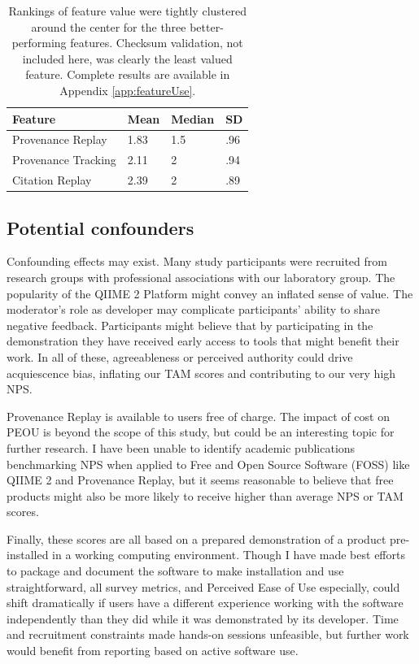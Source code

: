 \begin{table}[htp]
    \centering
    \begin{tabular}{|p{}|p{}|p{}|p{}|}
    \hline
    Feature             & Mean & Median & SD  \\ \hline
    Provenance Replay   & 1.83 & 1.5    & .96 \\
    Provenance Tracking & 2.11 & 2      & .94 \\
    Citation Replay     & 2.39 & 2      & .89 \\ \hline
    \end{tabular}
    \caption[Respondent rankings of feature value]%
    {Rankings of feature value were tightly clustered around the center for the
    three better-performing features. Checksum validation, not included here,
    was clearly the least valued feature. Complete results are available in
    Appendix \ref{app:featureUse}.}
    \label{tab:feature_rankings}
\end{table}

\subsection{Potential confounders}

Confounding effects may exist. Many study participants were recruited from
research groups with professional associations with our laboratory group. The
popularity of the QIIME 2 Platform might convey an inflated sense of value. The
moderator’s role as developer may complicate participants’ ability to share
negative feedback. Participants might believe that by participating in the
demonstration they have received early access to tools that might benefit their
work. In all of these, agreeableness or perceived authority could drive
acquiescence bias, inflating our TAM scores and contributing to our very high
NPS.

Provenance Replay is available to users free of charge. The impact of cost on
PEOU is beyond the scope of this study, but could be an interesting topic for
further research. I have been unable to identify academic publications
benchmarking NPS when applied to Free and Open Source Software (FOSS) like QIIME
2 and Provenance Replay, but it seems reasonable to believe that free products
might also be more likely to receive higher than average NPS or TAM scores.

Finally, these scores are all based on a prepared demonstration of a product
pre-installed in a working computing environment. Though I have made best
efforts to package and document the software to make installation and use
straightforward, all survey metrics, and Perceived Ease of Use especially, could
shift dramatically if users have a different experience working with the
software independently than they did while it was demonstrated by its developer.
Time and recruitment constraints made hands-on sessions unfeasible, but further
work would benefit from reporting based on active software use.


